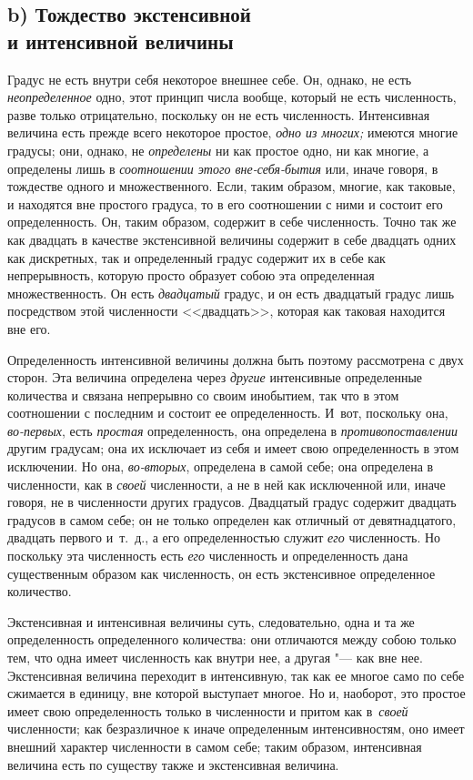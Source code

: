 \subsection[b) Тождество экстенсивной и интенсивной величины]%
{b) Тождество экстенсивной\\ и интенсивной величины}

Градус не есть внутри себя некоторое внешнее себе. Он, однако, не есть
{\em неопределенное} одно, этот принцип числа вообще, который не есть
численность, разве только отрицательно, поскольку он не есть численность.
Интенсивная величина есть прежде всего некоторое простое, {\em одно из многих;}
имеются многие градусы; они, однако, не {\em определены} ни как простое одно,
ни как многие, а определены лишь в {\em соотношении этого вне-себя-бытия} или,
иначе говоря, в тождестве одного и множественного. Если, таким образом, многие,
как таковые, и находятся вне простого градуса, то в его соотношении с ними и
состоит его определенность. Он, таким образом, содержит в себе численность.
Точно так же как двадцать в качестве экстенсивной величины содержит в себе
двадцать одних как дискретных, так и определенный градус содержит их в себе как
непрерывность, которую просто образует собою эта определенная множественность.
Он есть {\em двадцатый} градус, и он есть двадцатый градус лишь посредством
этой численности <<двадцать>>, которая как таковая находится вне его.

Определенность интенсивной величины должна быть поэтому рассмотрена с двух
сторон. Эта величина определена через {\em другие} интенсивные определенные
количества и связана непрерывно со своим инобытием, так что в этом соотношении
с последним и состоит ее определенность. И~вот, поскольку она, {\em во-первых},
есть {\em простая} определенность, она определена в {\em противопоставлении}
другим градусам; она их исключает из себя и имеет свою определенность в этом
исключении. Но она, {\em во-вторых}, определена в самой себе; она определена в
численности, как в {\em своей} численности, а не в ней как исключенной или,
иначе говоря, не в численности других градусов. Двадцатый градус содержит
двадцать градусов в самом себе; он не только определен как отличный от
девятнадцатого, двадцать первого и~т.~д., а его определенностью служит
{\em его} численность. Но поскольку эта численность есть {\em его} численность
и определенность дана существенным образом как численность, он есть
экстенсивное определенное количество.

Экстенсивная и интенсивная величины суть, следовательно, одна и та же
определенность определенного количества: они отличаются между собою только тем,
что одна имеет численность как внутри нее, а другая "--- как вне нее.
Экстенсивная величина переходит в интенсивную, так как ее многое само по себе
сжимается в единицу, вне которой выступает многое. Но и, наоборот, это простое
имеет свою определенность только в численности и притом как в~{\em своей}
численности; как безразличное к иначе определенным интенсивностям, оно имеет
внешний характер численности в самом себе; таким образом, интенсивная величина
есть по существу также и экстенсивная величина.

